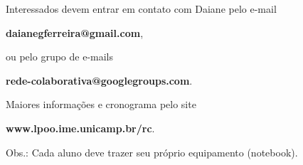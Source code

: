 \documentclass[12pt,a4paper]{letter}
\begin{document}
\begin{Large}
Interessados devem entrar em contato com Daiane pelo e-mail \vspace{-0.5cm}
\begin{center} {\bf daianegferreira@gmail.com}, \end{center}\vspace{-0.5cm}
ou pelo grupo de e-mails \vspace{-0.5cm}
\begin{center} {\bf rede-colaborativa@googlegroups.com}. \end{center}\vspace{-0.5cm}
Maiores informações e cronograma pelo site \vspace{-0.5cm}
\begin{center}  {\bf www.lpoo.ime.unicamp.br/rc}. \end{center}

Obs.: Cada aluno deve trazer seu próprio equipamento (notebook).

\end{Large}
\end{document}
